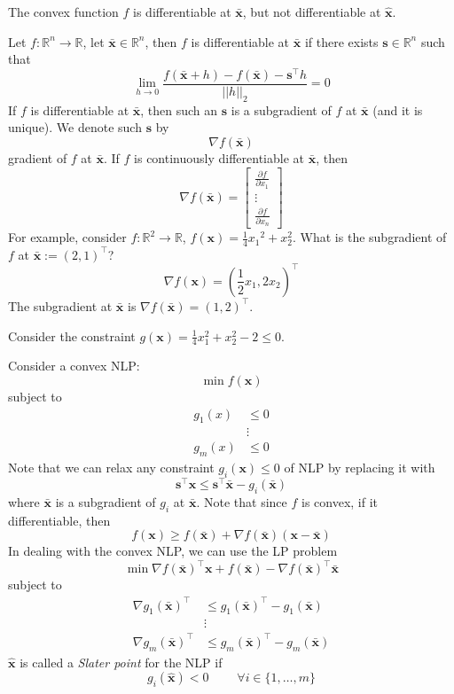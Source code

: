 The convex function $ f $ is differentiable at $ \bm{\bar{x}} $, but not
differentiable at $ \bm{\hat{x}} $.

Let $ f:\mathbb{R}^n\to\mathbb{R} $, let $ \bm{\bar{x}}\in\mathbb{R}^n $,
then $ f $ is differentiable at $ \bm{\bar{x}} $
if there exists $ \bm{s}\in \mathbb{R}^{n} $ such that
\[ \lim\limits_{{h} \to {0}} \frac{f(\bm{\bar{x}}+h)-f(\bm{\bar{x}})-\bm{s}^\top h}{||h||_{2}}=0 \]
If $ f $ is differentiable at $ \bm{\bar{x}} $, then such an $ \bm{s} $ is a subgradient
of $ f $ at $ \bm{\bar{x}} $ (and it is unique). We denote such $ \bm{s} $ by
\[ \nabla f(\bm{\bar{x}}) \]
gradient of $ f $ at $ \bm{\bar{x}} $. If $ f $ is continuously differentiable
at $ \bm{\bar{x}} $, then
\[ \nabla f(\bm{\bar{x}})=
    \begin{bmatrix}
        \frac{\partial f}{\partial x_1} \\
        \vdots                          \\
        \frac{\partial f}{\partial x_n}
    \end{bmatrix} \]
For example, consider $ f:\mathbb{R}^{2} \to \mathbb{R} $, $ f(\bm{x})=\frac{1}{4} {x_1}^2+x_2^2 $.
What is the subgradient of $ f $ at $ \bm{\bar{x}}:=(2,1)^\top $?
\[ \nabla f(\bm{x})=(\frac{1}{2} x_1, 2x_2)^\top \]
The subgradient at $ \bm{\bar{x}} $ is $ \nabla f(\bm{\bar{x}})=(1,2)^\top $.

Consider the constraint $ g(\bm{x})=\frac{1}{4} x_1^2+x_2^2-2\leqslant 0 $.

Consider a convex NLP\@:
\[ \min f(\bm{x}) \]
subject to
\begin{align*}
    g_1(x) & \leqslant 0 \\
           & \vdots      \\
    g_m(x) & \leqslant 0
\end{align*}
Note that we can relax any constraint $ g_i(\bm{x})\leqslant 0 $ of NLP by replacing it with
\[ \bm{s}^\top \bm{x}\leqslant \bm{s}^\top \bm{\bar{x}}-g_i(\bm{\bar{x}}) \]
where $ \bm{\bar{x}} $ is a subgradient of $ g_i $ at $ \bm{\bar{x}} $.
Note that since $ f $ is convex, if it differentiable, then
\[ f(\bm{x})\geqslant f(\bm{\bar{x}})+\nabla f(\bm{\bar{x}})(\bm{x}-\bm{\bar{x}}) \]
In dealing with the convex NLP, we can use the LP problem
\[ \min \nabla f(\bm{\bar{x}})^\top \bm{x}+f(\bm{\bar{x}})-\nabla f(\bm{\bar{x}})^\top \bm{\bar{x}} \]
subject to
\begin{align*}
    \nabla g_1(\bm{\bar{x}})^\top & \leqslant g_1(\bm{\bar{x}})^\top -g_1(\bm{\bar{x}}) \\
                                  & \vdots                                              \\
    \nabla g_m(\bm{\bar{x}})^\top & \leqslant g_m(\bm{\bar{x}})^\top -g_m(\bm{\bar{x}})
\end{align*}
$ \bm{\hat{x}} $ is called a \emph{Slater point} for the NLP if
\[ g_i(\bm{\hat{x}})<0\; \qquad \forall i\in \{1,\ldots ,m\} \]

